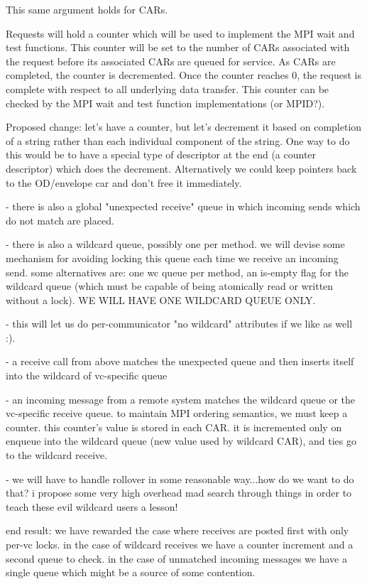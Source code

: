\documentclass[11pt,letterpaper]{article}
\begin{document}
This same argument holds for CARs.

Requests will hold a counter which will be used to implement the MPI wait and
test functions.  This counter will be set to the number of CARs associated with
the request before its associated CARs are queued for service.  As CARs are
completed, the counter is decremented.  Once the counter reaches 0, the request
is complete with respect to all underlying data transfer.  This counter can be
checked by the MPI wait and test function implementations (or MPID?).

Proposed change: let's have a counter, but let's decrement it based on
completion of a string rather than each individual component of the string.
One way to do this would be to have a special type of descriptor at the end (a
counter descriptor) which does the decrement.  Alternatively we could keep
pointers back to the OD/envelope car and don't free it immediately.

%
%
- there is also a global "unexpected receive" queue in which incoming sends
  which do not match are placed.

- there is also a wildcard queue, possibly one per method.  we will devise some
  mechanism for avoiding locking this queue each time we receive an incoming
  send.  some alternatives are: one wc queue per method, an is-empty flag for
  the wildcard queue (which must be capable of being atomically read or written
  without a lock).  WE WILL HAVE ONE WILDCARD QUEUE ONLY.

- this will let us do per-communicator "no wildcard" attributes if we like as
  well :).

- a receive call from above matches the unexpected queue and then inserts
  itself into the wildcard of vc-specific queue

- an incoming message from a remote system matches the wildcard queue or the
  vc-specific receive queue.  to maintain MPI ordering semantics, we must keep
  a counter.  this counter's value is stored in each CAR.  it is incremented
  only on enqueue into the wildcard queue (new value used by wildcard CAR), and
  ties go to the wildcard receive.  

- we will have to handle rollover in some reasonable way...how do we want to do
  that? i propose some very high overhead mad search through things in order
  to teach these evil wildcard users a lesson!

end result: we have rewarded the case where receives are posted first with only
per-vc locks.  in the case of wildcard receives we have a counter increment and
a second queue to check.  in the case of unmatched incoming messages we have a
single queue which might be a source of some contention.
\end{document}
